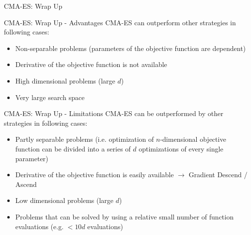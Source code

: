 \documentclass[11pt,compress,t,notes=noshow, xcolor=table]{beamer}
\begin{document}
\begin{frame}{CMA-ES: Wrap Up}
\begin{figure}
\begin{overprint}
\end{overprint}
\end{figure}
\end{frame}


\begin{vbframe}{CMA-ES: Wrap Up - Advantages}
CMA-ES can outperform other strategies in following cases:

\begin{itemize}
\item Non-separable problems (parameters of the objective function are dependent)
\item Derivative of the objective function is not available
\item High dimensional problems (large $d$)
\item Very large search space
\end{itemize}
\end{vbframe}


\begin{vbframe}{CMA-ES: Wrap Up - Limitations}
CMA-ES can be outperformed by other strategies in following cases:

\begin{itemize}
\item Partly separable problems (i.e. optimization of $n$-dimensional objective function can be divided into a series of $d$ optimizations of every single parameter)
\item Derivative of the objective function is easily available $\rightarrow$ Gradient Descend / Ascend
\item Low dimensional problems (large $d$)
\item Problems that can be solved by using a relative small number of function evaluations (e.g. $< 10 d$ evaluations)
\end{itemize}
\end{vbframe}
\end{document}
